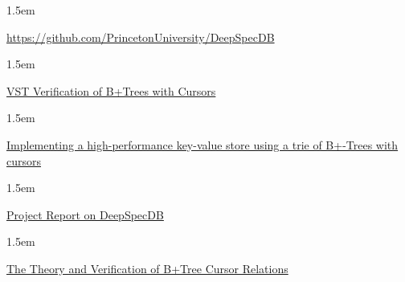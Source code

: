 \documentclass[12pt,twoside]{article}
\begin{document}
\begin{mddefinitions}%


\begin{mdbmarginx}{}{}{}{1.5em}%
\begin{mddefdata}%
\href{https://github.com/PrincetonUniversity/DeepSpecDB}{{\ttfamily https://\hspace{0pt}github.\hspace{0pt}com/\hspace{0pt}PrincetonUniversity/\hspace{0pt}DeepSpecDB}}
\end{mddefdata}%
\end{mdbmarginx}%


\begin{mdbmarginx}{}{}{}{1.5em}%
\begin{mddefdata}%
\href{http://perso.eleves.ens-rennes.fr/people/Aurele.Barriere/papers/vstbtrees.pdf}{VST Verification of B+Trees with Cursors}
\end{mddefdata}%
\end{mdbmarginx}%

\begin{mdbmarginx}{}{}{}{1.5em}%
\begin{mddefdata}%
\href{https://github.com/PrincetonUniversity/DeepSpecDB/blob/master/papers/adewale/Masters_Thesis.pdf}{Implementing a high-performance key-value store using a trie of B+-Trees with cursors}
\end{mddefdata}%
\end{mdbmarginx}%

\begin{mdbmarginx}{}{}{}{1.5em}%
\begin{mddefdata}%
\href{https://github.com/PrincetonUniversity/DeepSpecDB/blob/master/papers/luke/report.pdf}{Project Report on DeepSpecDB}
\end{mddefdata}%
\end{mdbmarginx}%

\begin{mdbmarginx}{}{}{}{1.5em}%
\begin{mddefdata}%
\href{https://github.com/PrincetonUniversity/DeepSpecDB/blob/master/papers/mcswiggen/McSwiggen-Thesis.pdf}{The Theory and Verification of B+Tree Cursor Relations}%
\end{mddefdata}%
\end{mdbmarginx}%
\end{mddefinitions}%
\end{document}
